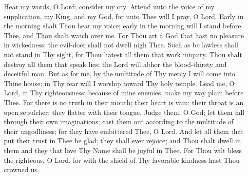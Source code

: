 Hear my words, O Lord; consider my cry. Attend unto the voice of my supplication, my King, and my God, for unto Thee will I pray, O Lord. Early in the morning shalt Thou hear my voice; early in the morning will I stand before Thee, and Thou shalt watch over me. For Thou art a God that hast no pleasure in wickedness; the evil-doer shall not dwell nigh Thee. Such as be lawless shall not stand in Thy sight, for Thou hatest all them that work iniquity. Thou shalt destroy all them that speak lies; the Lord will abhor the blood-thirsty and deceitful man. But as for me, by the multitude of Thy mercy I will come into Thine house; in Thy fear will I worship toward Thy holy temple. Lead me, O Lord, in Thy righteousness; because of mine enemies, make my way plain before Thee. For there is no truth in their mouth; their heart is vain; their throat is an open sepulcher; they flatter with their tongue. Judge them, O God; let them fall through their own imaginations; cast them out according to the multitude of their ungodliness; for they have embittered Thee, O Lord. And let all them that put their trust in Thee be glad; they shall ever rejoice; and Thou shalt dwell in them and they that love Thy Name shall be joyful in Thee. For Thou wilt bless the righteous, O Lord, for with the shield of Thy favorable kindness hast Thou crowned us.
